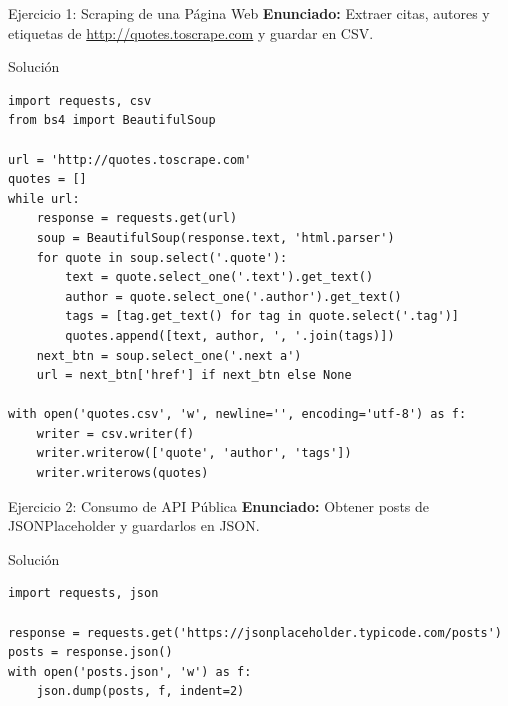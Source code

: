 \documentclass[aspectratio=169, 10pt, xcolor=table]{beamer}
\begin{document}
\begin{frame}[fragile]{Ejercicio 1: Scraping de una Página Web}
    \textbf{Enunciado:} Extraer citas, autores y etiquetas de \url{http://quotes.toscrape.com} y guardar en CSV.
    \begin{block}{Solución}
        \begin{lstlisting}[style=python]
import requests, csv
from bs4 import BeautifulSoup

url = 'http://quotes.toscrape.com'
quotes = []
while url:
    response = requests.get(url)
    soup = BeautifulSoup(response.text, 'html.parser')
    for quote in soup.select('.quote'):
        text = quote.select_one('.text').get_text()
        author = quote.select_one('.author').get_text()
        tags = [tag.get_text() for tag in quote.select('.tag')]
        quotes.append([text, author, ', '.join(tags)])
    next_btn = soup.select_one('.next a')
    url = next_btn['href'] if next_btn else None

with open('quotes.csv', 'w', newline='', encoding='utf-8') as f:
    writer = csv.writer(f)
    writer.writerow(['quote', 'author', 'tags'])
    writer.writerows(quotes)
        \end{lstlisting}
    \end{block}
\end{frame}

\begin{frame}[fragile]{Ejercicio 2: Consumo de API Pública}
    \textbf{Enunciado:} Obtener posts de JSONPlaceholder y guardarlos en JSON.
    \begin{block}{Solución}
        \begin{lstlisting}[style=python]
import requests, json

response = requests.get('https://jsonplaceholder.typicode.com/posts')
posts = response.json()
with open('posts.json', 'w') as f:
    json.dump(posts, f, indent=2)
        \end{lstlisting}
    \end{block}
\end{frame}
\end{document}
